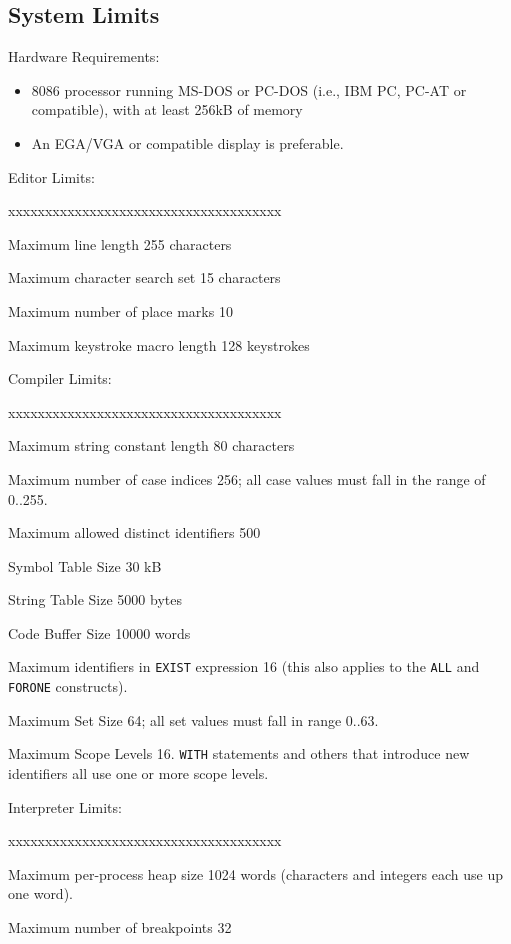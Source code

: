 \subsection[System Limits]{System Limits}

\vspace{1cm}
{\large Hardware Requirements:}

\begin{itemize}
\item 8086 processor running MS-DOS or PC-DOS (i.e., IBM PC, PC-AT or
compatible), with at least 256kB of memory
\item An EGA/VGA or compatible display is preferable.
\end{itemize}

\vspace{1cm}
{\large Editor Limits:}

\begin{describe}{xxxxxxxxxxxxxxxxxxxxxxxxxxxxxxxxxxxxx}
\item[Maximum line length]255 characters
\item[Maximum character search set]15 characters
\item[Maximum number of place marks]10
\item[Maximum keystroke macro length]128 keystrokes
\end{describe}

\vspace{1cm}
{\large Compiler Limits:}

\begin{describe}{xxxxxxxxxxxxxxxxxxxxxxxxxxxxxxxxxxxxx}
\item[Maximum string constant length]80 characters
\item[Maximum number of case indices]256; all case values must fall
in the range of 0..255.
\item[Maximum allowed distinct identifiers]500
\item[Symbol Table Size]30 kB
\item[String Table Size]5000 bytes
\item[Code Buffer Size]10000 words
\item[Maximum identifiers in {\tt EXIST} expression]16 (this also applies
to the {\tt ALL} and {\tt FORONE} constructs).
\item[Maximum Set Size]64; all set values must fall in range 0..63.
\item[Maximum Scope Levels]16. {\tt WITH} statements and
others that introduce new identifiers all use one or more scope
levels.
\end{describe}
\vspace{1cm}
{\large Interpreter Limits:}
\begin{describe}{xxxxxxxxxxxxxxxxxxxxxxxxxxxxxxxxxxxxx}
\item[Maximum per-process heap size]1024 words (characters and
integers each use up one word).
\item[Maximum number of breakpoints]32
\end{describe}
\vspace{1cm}

